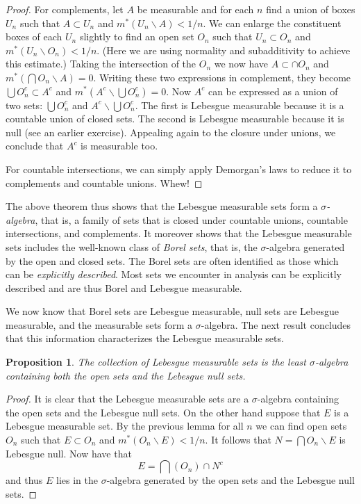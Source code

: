 \documentclass[11pt,oneside]{amsbook}
\renewcommand{\setminus}{\smallsetminus}
\theoremstyle{definition}
\theoremstyle{plain}
\newtheorem{prop}[thm]{Proposition}
\theoremstyle{definition}
\theoremstyle{remark}
\numberwithin{equation}{section}
\numberwithin{figure}{section}
\begin{document}
\begin{proof}
  For complements, let $A$ be measurable and for each $n$ find a union of boxes $U_n$ such that $A\subset U_n$ and $m^*(U_n\setminus A)<1/n$. We can enlarge the constituent boxes of each $U_n$ slightly to find an open set $O_n$ such that $U_n\subset O_n$ and $m^*(U_n\setminus O_n)<1/n$. (Here we are using normality and subadditivity to achieve this estimate.) Taking the intersection of the $O_n$ we now have $A\subset\cap O_n$ and $m^*(\bigcap O_n\setminus A)=0$. Writing these two expressions in complement, they become $\bigcup O_n^c\subset A^c$ and $m^*(A^c\setminus\bigcup O_n^c)=0$. Now $A^c$ can be expressed as a union of two sets: $\bigcup O_n^c$ and $A^c\setminus\bigcup O_n^c$. The first is Lebesgue measurable because it is a countable union of closed sets. The second is Lebesgue measurable because it is null (see an earlier exercise). Appealing again to the closure under unions, we conclude that $A^c$ is measurable too.

  For countable intersections, we can simply apply Demorgan's laws to reduce it to complements and countable unions. Whew!
\end{proof}

The above theorem thus shows that the Lebesgue measurable sets form a \emph{$\sigma$-algebra}, that is, a family of sets that is closed under countable unions, countable intersections, and complements. It moreover shows that the Lebesgue measurable sets includes the well-known class of \emph{Borel sets}, that is, the $\sigma$-algebra generated by the open and closed sets. The Borel sets are often identified as those which can be \emph{explicitly described}. Most sets we encounter in analysis can be explicitly described and are thus Borel and Lebesgue measurable.

We now know that Borel sets are Lebesgue measurable, null sets are Lebesgue measurable, and the measurable sets form a $\sigma$-algebra. The next result concludes that this information characterizes the Lebesgue measurable sets.

\begin{prop}
  The collection of Lebesgue measurable sets is the least $\sigma$-algebra containing both the open sets and the Lebesgue null sets.
\end{prop}

\begin{proof}
  It is clear that the Lebesgue measurable sets are a $\sigma$-algebra containing the open sets and the Lebesgue null sets. On the other hand suppose that $E$ is a Lebesgue measurable set. By the previous lemma for all $n$ we can find open sets $O_n$ such that $E\subset O_n$ and $m^*(O_n\setminus E)<1/n$. It follows that $N=\bigcap O_n\setminus E$ is Lebesgue null. Now have that
  \[E=\bigcap(O_n)\cap N^c
  \]
  and thus $E$ lies in the $\sigma$-algebra generated by the open sets and the Lebesgue null sets.
\end{proof}
\end{document}
